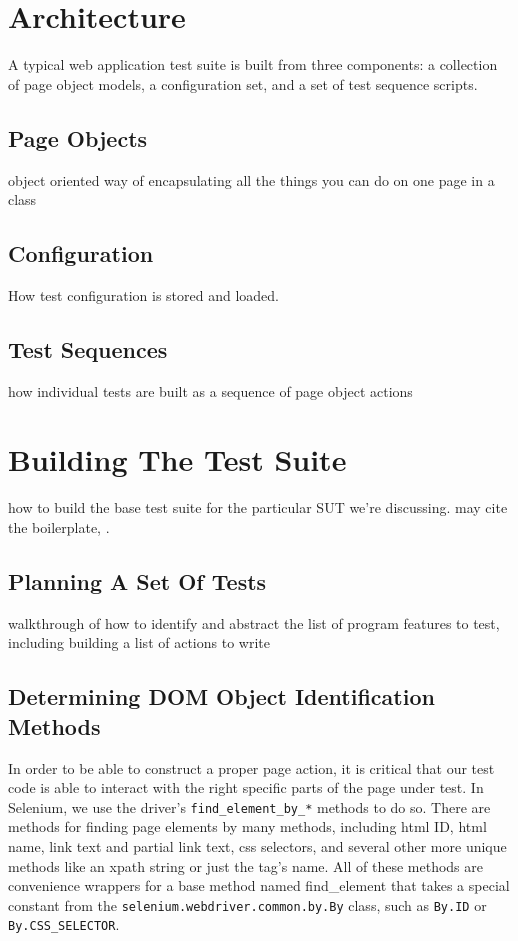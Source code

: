 \section{Architecture}
A typical web application test suite is built from three components: a collection of page object models, a configuration set, and a set of test sequence scripts.

\subsection{Page Objects}
object oriented way of encapsulating all the things you can do on one page in a class \citep{liu2000object, kung2000object, leotta2013improving, marchetto2008state}

\subsection{Configuration}
How test configuration is stored and loaded. \citep{gupta2003dom,DOMStand78, nicholus2016understanding}

\subsection{Test Sequences}
how individual tests are built as a sequence of page object actions \citep{leotta2013capture}

\section{Building The Test Suite}
how to build the base test suite for the particular SUT we're discussing. may cite the boilerplate, \citep{GitHubma29}.

\subsection{Planning A Set Of Tests}
walkthrough of how to identify and abstract the list of program features to test, including building a list of actions to write \citep{nguyen2001testing}

\subsection{Determining DOM Object Identification Methods}
In order to be able to construct a proper page action, it is critical that our test code is able to interact with the right specific parts of the page under test. In Selenium, we use the driver's \texttt{find\_element\_by\_*} methods to do so. There are methods for finding page elements by many methods, including html ID, html name, link text and partial link text, css selectors, and several other more unique methods like an xpath string or just the tag's name. All of these methods are convenience wrappers for a base method named find\_element that takes a special constant from the \texttt{selenium.webdriver.common.by.By} class, such as \texttt{By.ID} or \texttt{By.CSS\_SELECTOR}.

